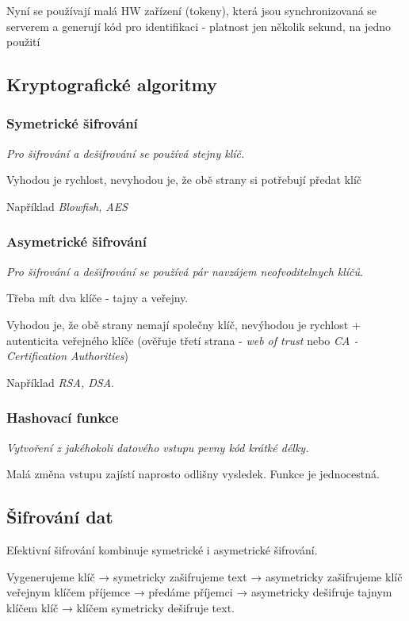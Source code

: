 \documentclass[10pt,a4paper]{article}
\begin{document}
Nyní se používají malá HW zařízení (tokeny), která jsou synchronizovaná se serverem a generují kód pro identifikaci - platnost jen několik sekund, na jedno použití

\subsection{Kryptografické algoritmy}

\subsubsection{Symetrické šifrování}

\textit{Pro šifrování a dešifrování se používá stejny klíč.}

Vyhodou je rychlost, nevyhodou je, že obě strany si potřebují předat klíč

Například \textit{Blowfish, AES}

\subsubsection{Asymetrické šifrování}

\textit{Pro šifrování a dešifrování se používá pár navzájem neofvoditelnych klíčů}.

Třeba mít dva klíče - tajny a veřejny.

Vyhodou je, že obě strany nemají společny klíč, nevýhodou je rychlost + autenticita veřejného klíče (ověřuje třetí strana - \textit{web of trust} nebo \textit{CA - Certification Authorities})

Například \textit{RSA, DSA}.


\subsubsection{Hashovací funkce}

\textit{Vytvoření z jakéhokoli datového vstupu pevny kód krátké délky.}

Malá změna vstupu zajístí naprosto odlišny vysledek.
Funkce je jednocestná.

\subsection{Šifrování dat}

Efektivní šifrování kombinuje symetrické i asymetrické šifrování. 

Vygenerujeme klíč → symetricky zašifrujeme text → asymetricky zašifrujeme klíč veřejnym klíčem příjemce → předáme příjemci → asymetricky dešifruje tajnym klíčem klíč → klíčem symetricky dešifruje text.
\end{document}
